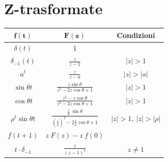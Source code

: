 \documentclass{report}
\theoremstyle{nostyle}
\begin{document}
\section{Z-trasformate}
{
\renewcommand{\arraystretch}{3.0} 
\begin{center}
\begin{tabular}{|c|c|c|}
     \hline
     $\displaystyle \bm{f(t)}$ & $\displaystyle \bm{F(z)}$  &  \textbf{Condizioni}\\
     \hline
     \rowcolor{SALZO}
     $\displaystyle \delta(t)$  & $1$  &  \\
     $\displaystyle \delta_{-1}(t)$  &  $\displaystyle \frac{z}{z-1}$  & $\displaystyle |z|>1$ \\
     \rowcolor{SALZO}
     $ \displaystyle a^t$  &  $\displaystyle  \frac{z}{z-a}$  &  $\displaystyle |z|>|a|$\\
     $\displaystyle \sin \theta t$ & $\displaystyle \frac{z \sin \theta }{z^2-2z\cos\theta +1}$  & $\displaystyle |z|>1$\\
     \rowcolor{SALZO}
     $\displaystyle \cos \theta t$ & $\displaystyle \frac{z^2 -  z \cos \theta }{z^2-2z\cos\theta +1}$  & $\displaystyle |z|>1$\\
     $\displaystyle \rho^t\sin \theta t$ & $\displaystyle \frac{\frac{z}{p}\ \sin \theta}{(\frac{z}{\rho})^2-2\frac{z}{\rho}\cos \theta +1}$ & $|z|>1,\ |z|>|\rho|$\\
     \rowcolor{SALZO}
     $f(t+1)$ & $z\ F(z)-z\ f(0)$ & \\
     $\displaystyle t\cdot \delta_{-1}$ & $\displaystyle \frac{z}{(z-1)^2}$ & $z\neq 1$\\
     \hline
      
\end{tabular}
\end{center}
}
\end{document}
